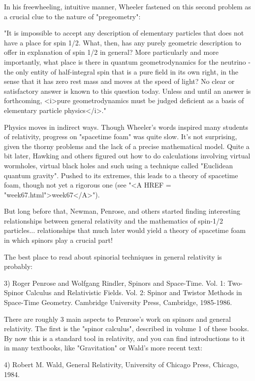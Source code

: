 In his freewheeling, intuitive manner, Wheeler fastened on this
second problem as a crucial clue to the nature of "pregeometry":

"It is impossible to accept any description of elementary particles
that does not have a place for spin 1/2.  What, then, has any purely
geometric description to offer in explanation of spin 1/2 in general?
More particularly and more importantly, what place is there in quantum
geometrodynamics for the neutrino - the only entity of half-integral
spin that is a pure field in its own right, in the sense that it has
zero rest mass and moves at the speed of light?  No clear or satisfactory
answer is known to this question today.  Unless and until an answer
is forthcoming, <i>pure geometrodynamics must be judged deficient as a
basis of elementary particle physics</i>."

Physics moves in indirect ways.  Though Wheeler's words inspired many
students of relativity, progress on "spacetime foam" was quite slow.
It's not surprising, given the thorny problems and the lack of a precise
mathematical model.  Quite a bit later, Hawking and others figured out
how to do calculations involving virtual wormholes, virtual black holes
and such using a technique called "Euclidean quantum gravity".  Pushed
to its extremes, this leads to a theory of spacetime foam, though not
yet a rigorous one (see "<A HREF = "week67.html">week67</A>").  

But long before that, Newman, Penrose, and others started finding
interesting relationships between general relativity and the mathematics
of spin-1/2 particles... relationships that much later would yield a
theory of spacetime foam in which spinors play a crucial part!

The best place to read about spinorial techniques in general relativity
is probably:

3) Roger Penrose and Wolfgang Rindler, Spinors and Space-Time.  Vol. 1:
Two-Spinor Calculus and Relativistic Fields.  Vol. 2: Spinor and Twistor
Methods in Space-Time Geometry.  Cambridge University Press, Cambridge,
1985-1986.

There are roughly 3 main aspects to Penrose's work on spinors and
general relativity.  The first is the "spinor calculus", described in
volume 1 of these books.  By now this is a standard tool in relativity,
and you can find introductions to it in many textbooks, like
"Gravitation" or Wald's more recent text:

4) Robert M. Wald, General Relativity, University of Chicago Press,
Chicago, 1984.  

